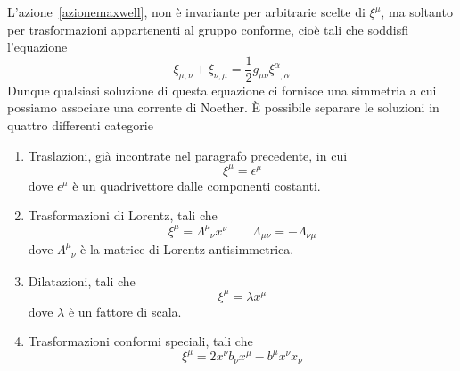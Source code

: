     L'azione~\eqref{azionemaxwell}, non è invariante per arbitrarie scelte di $\xi^\mu$, ma soltanto per trasformazioni appartenenti al gruppo conforme, cioè tali che soddisfi l'equazione
\begin{equation}\label{conforme}
    \xi_{\mu,\nu} + \xi_{\nu,\mu} = \frac{1}{2} g_{\mu\nu} \xi^\alpha_{\phantom \alpha ,\alpha}
\end{equation} 
    Dunque qualsiasi soluzione di questa equazione ci fornisce una simmetria a cui possiamo associare una corrente di Noether. È possibile separare le soluzioni in quattro differenti categorie 
\begin{enumerate}
    \item Traslazioni, già incontrate nel paragrafo precedente, in cui
\begin{equation*}
    \xi^\mu = \epsilon^\mu
\end{equation*}
    dove $\epsilon^\mu$ è un quadrivettore dalle componenti costanti.
    \item Trasformazioni di Lorentz, tali che 
\begin{equation*}
    \xi^\mu = \Lambda^\mu_{\phantom \mu \nu} x^\nu \qquad \Lambda_{\mu\nu} = - \Lambda_{\nu\mu}
\end{equation*}
    dove $\Lambda^\mu_{\phantom \mu \nu}$ è la matrice di Lorentz antisimmetrica.
    \item Dilatazioni, tali che
\begin{equation*}
    \xi^\mu = \lambda x^\mu
\end{equation*}
    dove $\lambda$ è un fattore di scala.
    \item Trasformazioni conformi speciali, tali che
\begin{equation*}
    \xi^\mu = 2 x^\nu b_\nu x^\mu - b^\mu x^\nu x_\nu
\end{equation*}
\end{enumerate}

